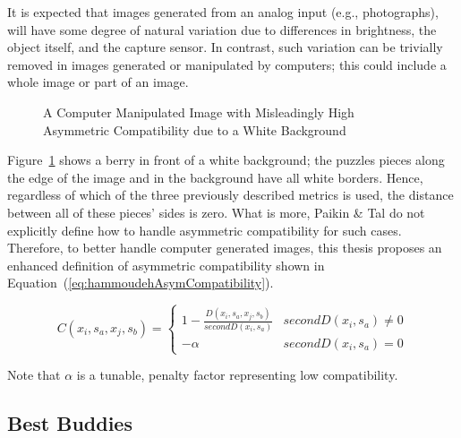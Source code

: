 \documentclass{report}
\def\eref#1{(\ref{#1})}
\begin{document}
It is expected that images generated from an analog input (e.g., photographs), will have some degree of natural variation due to differences in brightness, the object itself, and the capture sensor.  In contrast, such variation can be trivially removed in images generated or manipulated by computers; this could include a whole image or part of an image.

\begin{figure}
\centering
{}
\caption{A Computer Manipulated Image with Misleadingly High Asymmetric Compatibility due to a White Background}
\label{fig:objectWhiteBackground}
\end{figure}

Figure~\ref{fig:objectWhiteBackground} shows a berry in front of a white background; the puzzles pieces along the edge of the image and in the background have all white borders.  Hence, regardless of which of the three previously described metrics is used, the distance between all of these pieces' sides is zero.  What is more, Paikin \& Tal do not explicitly define how to handle asymmetric compatibility for such cases.  Therefore, to better handle computer generated images, this thesis proposes an enhanced definition of asymmetric compatibility shown in Equation~\eref{eq:hammoudehAsymCompatibility}.  

\begin{equation} \label{eq:hammoudehAsymCompatibility}
C(x_i,s_a,x_j,s_b)= \begin{cases} 
	1 - \frac{D(x_i,s_a,x_j,s_b)}{secondD(x_i,s_a)} & secondD(x_i,s_a) \ne 0
\\
	-\alpha & secondD(x_i,s_a) = 0
\end{cases} 
\end{equation}

\noindent
Note that $\alpha$ is a tunable, penalty factor representing low compatibility.


\subsection{Best Buddies}\label{sec:bestBuddies}
\end{document}
